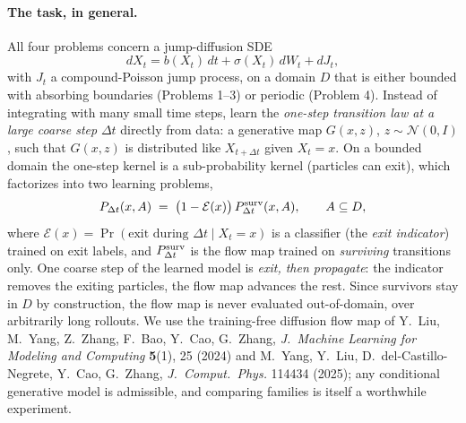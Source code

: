 \documentclass[11pt]{article}
\begin{document}
\paragraph{The task, in general.} All four problems concern a
jump-diffusion SDE
\begin{equation*}
dX_t = b(X_t)\,dt + \sigma(X_t)\,dW_t + dJ_t,
\end{equation*}
with $J_t$ a compound-Poisson jump process, on a domain $D$ that is
either bounded with absorbing boundaries (Problems 1--3) or periodic
(Problem 4). Instead of integrating with many small time steps, learn the
\emph{one-step transition law at a large coarse step} $\Delta t$ directly
from data: a generative map $G(x,z)$, $z\sim\mathcal N(0,I)$, such that
$G(x,z)$ is distributed like $X_{t+\Delta t}$ given $X_t=x$. On a bounded
domain the one-step kernel is a sub-probability kernel (particles can
exit), which factorizes into two learning problems,
\begin{equation*}
P_{\Delta t}(x,A)\;=\;\bigl(1-\mathcal E(x)\bigr)\,
P^{\rm surv}_{\Delta t}(x,A), \qquad A\subseteq D,
\end{equation*}
where $\mathcal E(x)=\Pr(\text{exit during }\Delta t\mid X_t=x)$ is a
classifier (the \emph{exit indicator}) trained on exit labels, and
$P^{\rm surv}_{\Delta t}$ is the flow map trained on \emph{surviving}
transitions only. One coarse step of the learned model is \emph{exit,
then propagate}: the indicator removes the exiting particles, the flow
map advances the rest. Since survivors stay in $D$ by construction, the
flow map is never evaluated out-of-domain, over arbitrarily long
rollouts. We use the training-free diffusion flow map of Y.~Liu, M.~Yang,
Z.~Zhang, F.~Bao, Y.~Cao, G.~Zhang, \emph{J.~Machine Learning for
Modeling and Computing} \textbf{5}(1), 25 (2024) and M.~Yang, Y.~Liu,
D.~del-Castillo-Negrete, Y.~Cao, G.~Zhang, \emph{J.~Comput.\ Phys.}
114434 (2025); any conditional generative model is admissible, and
comparing families is itself a worthwhile experiment.
\end{document}
